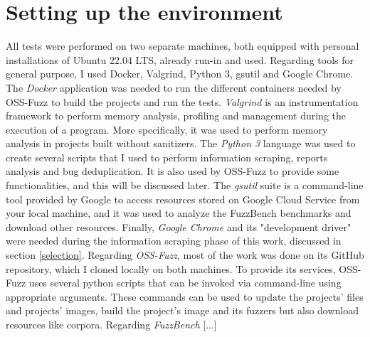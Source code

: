 \newpage
\section{Setting up the environment}
All tests were performed on two separate machines, both equipped with personal installations of Ubuntu 22.04 LTS, already run-in and used.
\newline \newline \newline
Regarding tools for general purpose, I used Docker, Valgrind, Python 3, gsutil and Google Chrome.
\newline \newline
The \textit{Docker} application was needed to run the different containers needed by OSS-Fuzz to build the projects and run the tests.
\newline \newline
\textit{Valgrind} \cite{valgrind} is an instrumentation framework to perform memory analysis, profiling and management during the execution of a program.
More specifically, it was used to perform memory analysis in projects built without sanitizers.
\newline \newline
The \textit{Python 3} language was used to create several scripts that I used to perform information scraping, reports analysis and bug deduplication.
It is also used by OSS-Fuzz to provide some functionalities, and this will be discussed later. 
\newline \newline
The \textit{gsutil} suite is a command-line tool provided by Google to access resources stored on Google Cloud Service from your local machine, and it was used to analyze the FuzzBench benchmarks and download other resources.
\newline \newline
Finally, \textit{Google Chrome} and its "development driver" were needed during the information scraping phase of this work, discussed in section \ref{selection}.
\newline \newline \newline
Regarding \textit{OSS-Fuzz}, most of the work was done on its GitHub repository, which I cloned locally on both machines.
\newline
To provide its services, OSS-Fuzz uses several python scripts that can be invoked via command-line using appropriate arguments. These commands can be used to update the projects' files and projects' images, build the project's image and its fuzzers but also download resources like corpora. 
\newline \newline \newline
Regarding \textit{FuzzBench} [...]

